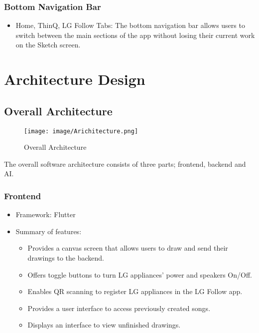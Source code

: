 \documentclass[conference]{IEEEtran}
\begin{document}
\subsubsection{Bottom Navigation Bar}
\begin{itemize}
    \item Home, ThinQ, LG Follow Tabs: The bottom navigation bar allows users to switch between the main sections of the app without losing their current work on the Sketch screen.\\
\end{itemize}


\section{Architecture Design}

\subsection{Overall Architecture}

\begin{figure}[h!]
    \centering
    \texttt{[image: image/Arichitecture.png]}
    \caption{Overall Architecture}
    \label{fig:enter-label}
\end{figure}

 \noindent The overall software architecture consists of three parts; frontend, backend and AI.\\

 \subsubsection{Frontend}
 \begin{itemize}
     \item Framework: Flutter\\
     \item Summary of features:
\begin{itemize}
    \item Provides a canvas screen that allows users to draw and send their drawings to the backend.\\
    \item Offers toggle buttons to turn LG appliances' power and speakers On/Off.\\
    \item Enables QR scanning to register LG appliances in the LG Follow app.\\
    \item Provides a user interface to access previously created songs.\\
    \item Displays an interface to view unfinished drawings.\\
\end{itemize}
 \end{itemize}
\end{document}
